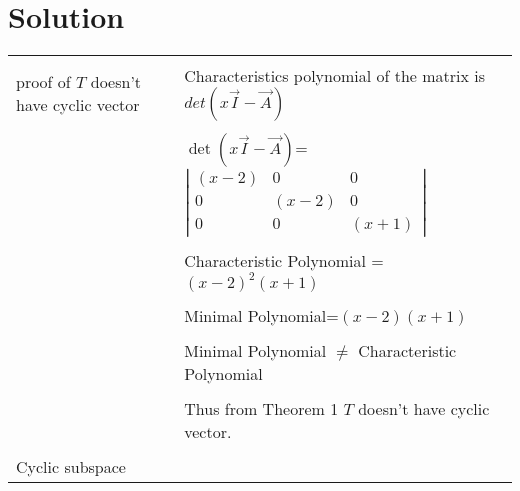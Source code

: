 \documentclass[journal,12pt]{IEEEtran}
\begin{document}
\section{\textbf{Solution}}
\renewcommand{\thetable}{2}
\begin{longtable}{|l|l|}
\hline

\multirow{3}{*}{proof of $T$ doesn't have cyclic vector } & \\
&
Characteristics polynomial of the matrix  is $det(x\vec{I}-\vec{A})$\\ 
&\\
& $\det(x\vec{I}-\vec{A})$= $\left|
                \begin{array}{ccc}
                (x-2) & 0 & 0\\
                0 & (x-2) & 0\\
                0 & 0 & (x+1)
                \end{array} \right|$  \\
&\\
& Characteristic Polynomial = $(x-2)^2(x+1)$\\
&\\
& Minimal Polynomial=$(x-2)(x+1)$\\
&\\
&Minimal Polynomial $\neq$ Characteristic Polynomial \\
&\\
&Thus from Theorem 1 $T$ doesn't have cyclic vector.\\  
&\\
\hline
\multirow{3}{*}{Cyclic subspace} & \\


\end{longtable}
\end{document}
